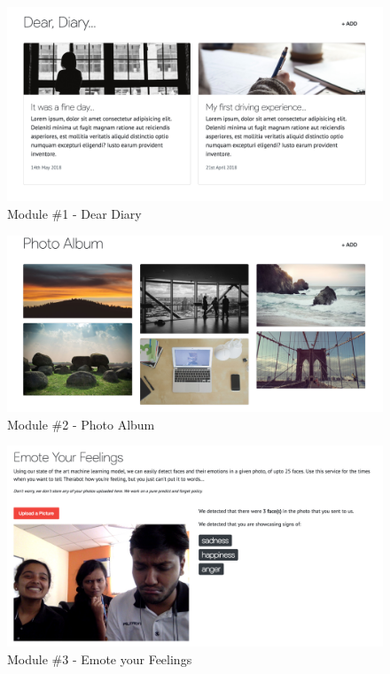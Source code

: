 \begin{figure}[H]
    \centering
    \includegraphics[width=\textwidth]{images/screenshots/website/website-dear-diary.png}
    \caption{Module \#1 - Dear Diary}
\end{figure}
\vspace*{\fill}

\pagebreak

\vspace*{\fill}
\begin{figure}[H]
    \centering
    \includegraphics[width=\textwidth]{images/screenshots/website/website-photo-album.png}
    \caption{Module \#2 - Photo Album}
\end{figure}

\begin{figure}[H]
    \centering
    \includegraphics[width=\textwidth]{images/screenshots/website/website-emote-feelings.png}
    \caption{Module \#3 - Emote your Feelings}
\end{figure}
\vspace*{\fill}

